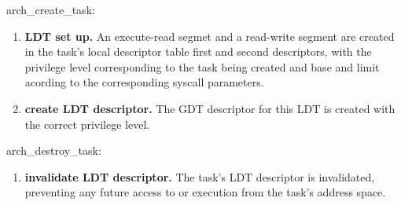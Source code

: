 \documentclass[11pt, letterpaper, twoside, english]{book}
\begin{document}
\textsf{arch\_create\_task}: 
\begin{enumerate}
\item[]\textbf{LDT set up.} An execute-read segmet and a read-write segment are created in the task's local descriptor table first and second descriptors, with the privilege level corresponding to the task being created and base and limit acording to the corresponding syscall parameters.
\item[]\textbf{create LDT descriptor.} The GDT descriptor for this LDT is created with the correct privilege level.
\end{enumerate}

\textsf{arch\_destroy\_task}: 
\begin{enumerate}
\item[]\textbf{invalidate LDT descriptor.} The task's LDT descriptor is invalidated, preventing any future access to or execution from the task's address space.
\end{enumerate}
\end{document}
